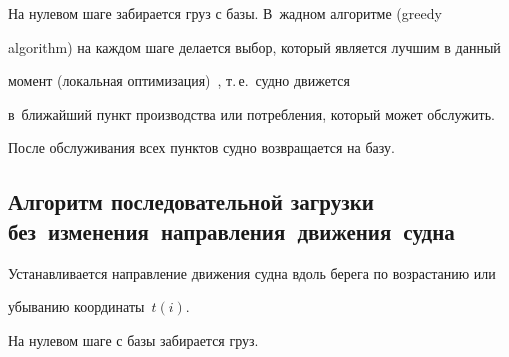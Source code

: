 \vspace*{-2pt}





  На нулевом шаге забирается груз с базы. В~жадном алгоритме (greedy 


algorithm) на каждом шаге делается выбор, который является лучшим в данный 


момент (локальная оптимизация)~\cite{14-br, 13-br}, т.\,е.\ судно движется 


в~ближайший пункт производства или потребления, который может обслужить. 


После обслуживания всех пунктов судно возвращается на базу.





\vspace*{-6pt}





\subsection{Алгоритм последовательной загрузки без~изменения~направления~движения~судна}





\vspace*{-2pt}





  Устанавливается направление движения судна вдоль берега по возрастанию или 


убыванию координаты~$t(i)$.


  


  На нулевом шаге с базы забирается груз. 


